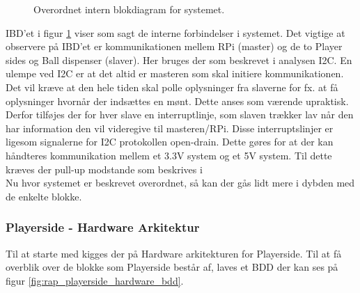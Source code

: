 \documentclass[Rapport/Rapport_main.tex]{subfiles}
\begin{document}
\begin{figure}[H]
    \centering
    \caption{Overordnet intern blokdiagram for systemet.}
    \label{fig:rap_overall_hardware_ibd}
\end{figure}
IBD'et i figur \ref{fig:rap_overall_hardware_ibd} viser som sagt de interne forbindelser i systemet. Det vigtige at observere på IBD'et er kommunikationen mellem RPi (master) og de to Player sides og Ball dispenser (slaver). Her bruges der som beskrevet i analysen  I2C. En ulempe ved I2C er at det altid er masteren som skal initiere kommunikationen. Det vil kræve at den hele tiden skal polle oplysninger fra slaverne for fx. at få oplysninger hvornår der indsættes en mønt. Dette anses som værende upraktisk. Derfor tilføjes der for hver slave en interruptlinje,  som slaven trækker lav når den har information den vil videregive til masteren/RPi. Disse interruptslinjer er ligesom signalerne for I2C protokollen open-drain. Dette gøres for at der kan håndteres kommunikation mellem et 3.3V system og et 5V system. Til dette kræves der pull-up modstande som beskrives i  \\
Nu hvor systemet er beskrevet overordnet, så kan der gås lidt mere i dybden med de enkelte blokke.
\subsubsection{Playerside - Hardware Arkitektur}
Til at starte med kigges der på Hardware arkitekturen for Playerside. Til at få overblik over de blokke som Playerside består af, laves et BDD der kan ses på figur \ref{fig:rap_playerside_hardware_bdd}.
\end{document}
